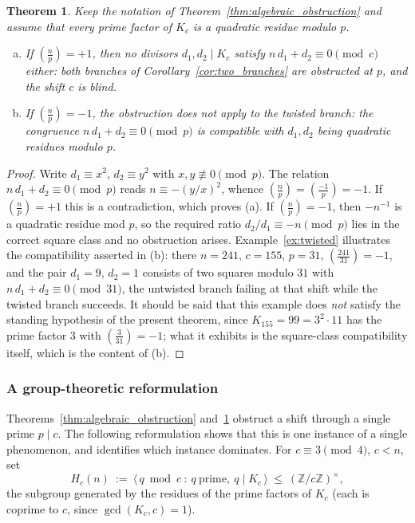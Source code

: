 \documentclass[11pt, a4paper]{article}
\theoremstyle{plain}
\newtheorem{theorem}{Theorem}[section]
\theoremstyle{definition}
\newcommand{\Z}{\mathbb{Z}}
\newcommand{\leg}[2]{\left(\frac{#1}{#2}\right)}
\begin{document}
\begin{theorem} \label{thm:twisted_obstruction}
Keep the notation of Theorem~\ref{thm:algebraic_obstruction} and assume that every prime factor of $K_c$ is a quadratic residue modulo $p$.
\begin{enumerate}[(a)]
    \item If $\leg np=+1$, then no divisors $d_1,d_2\mid K_c$ satisfy $n\,d_1+d_2\equiv0\pmod c$ either: both branches of Corollary~\ref{cor:two_branches} are obstructed at $p$, and the shift $c$ is blind.
    \item If $\leg np=-1$, the obstruction does not apply to the twisted branch: the congruence $n\,d_1+d_2\equiv0\pmod p$ is compatible with $d_1,d_2$ being quadratic residues modulo $p$.
\end{enumerate}
\end{theorem}
\begin{proof}
Write $d_1\equiv x^{2}$, $d_2\equiv y^{2}$ with $x,y\not\equiv0\pmod p$. The relation $n\,d_1+d_2\equiv0\pmod p$ reads $n\equiv-(y/x)^{2}$, whence $\leg np=\leg{-1}p=-1$. If $\leg np=+1$ this is a contradiction, which proves (a). If $\leg np=-1$, then $-n^{-1}$ is a quadratic residue mod $p$, so the required ratio $d_2/d_1\equiv-n\pmod p$ lies in the correct square class and no obstruction arises. Example~\ref{ex:twisted} illustrates the compatibility asserted in (b): there $n=241$, $c=155$, $p=31$, $\leg{241}{31}=-1$, and the pair $d_1=9$, $d_2=1$ consists of two squares modulo $31$ with $n\,d_1+d_2\equiv0\pmod{31}$, the untwisted branch failing at that shift while the twisted branch succeeds. It should be said that this example does \emph{not} satisfy the standing hypothesis of the present theorem, since $K_{155}=99=3^{2}\cdot11$ has the prime factor $3$ with $\leg{3}{31}=-1$; what it exhibits is the square-class compatibility itself, which is the content of (b).
\end{proof}

\subsubsection{A group-theoretic reformulation} \label{sec:5.1.1bis}

Theorems~\ref{thm:algebraic_obstruction} and~\ref{thm:twisted_obstruction} obstruct a shift through a single prime $p\mid c$. The following reformulation shows that this is one instance of a single phenomenon, and identifies which instance dominates. For $c\equiv3\pmod4$, $c<n$, set
$$H_c(n)\ :=\ \big\langle\, q\bmod c\ :\ q\ \text{prime},\ q\mid K_c\,\big\rangle\ \le\ (\Z/c\Z)^{\times},$$
the subgroup generated by the residues of the prime factors of $K_c$ (each is coprime to $c$, since $\gcd(K_c,c)=1$).
\end{document}
